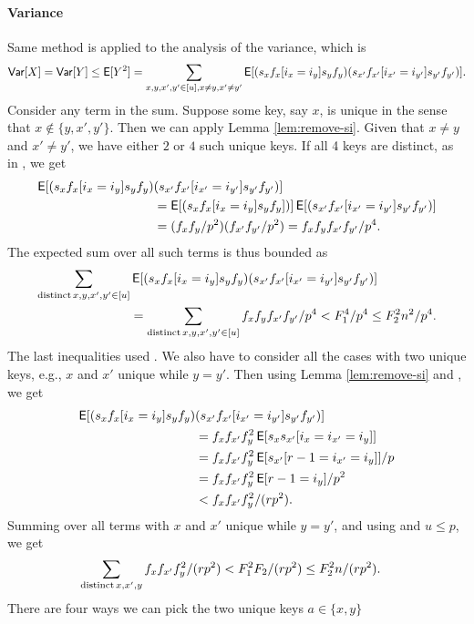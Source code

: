 \paragraph{Variance}
Same method is applied to the analysis of the variance, which is
\[{\sf Var}[X]={\sf Var}[Y]\leq \operatorname*{\sf{E}}[Y^2]=
\sum_{x,y,x',y'\in[u],x\neq y,x'\neq y'}\operatorname*{\sf{E}}[(s_x f_x[i_x=i_y]s_y f_y)
  (s_{x'}f_{x'}[i_{x'}=i_{y'}]s_{y'} f_{y'})].\] 
Consider any term in the
sum. Suppose some key, say $x$, is unique in the sense that
$x\not\in\{y,x',y'\}$. Then we can apply Lemma \ref{lem:remove-si}.
Given that $x\neq y$
and $x'\neq y'$, we have either $2$ or $4$ such unique keys. If all
4 keys are distinct, as in , we get
\begin{align*}
\operatorname*{\sf{E}}[(s_x f_x[i_x=i_y]s_y f_y)&
(s_{x'}f_{x'}[i_{x'}=i_{y'}]s_{y'} f_{y'})]\\
&=\operatorname*{\sf{E}}[(s_x f_x[i_x=i_y]s_y f_y])]\operatorname*{\sf{E}}[(s_{x'}f_{x'}[i_{x'}=i_{y'}]s_{y'} f_{y'})]\\
&=(f_x f_y/p^2)(f_{x'} f_{y'}/p^2)=f_x f_yf_{x'} f_{y'}/p^4.
\end{align*}
The expected sum over all such terms is thus bounded
as 
\begin{align}
\sum_{{\rm distinct}\, x,y,x',y'\in[u]}&
\operatorname*{\sf{E}}[(s_x f_x[i_x=i_y]s_y f_y)
(s_{x'}f_{x'}[i_{x'}=i_{y'}]s_{y'} f_{y'})]\nonumber\\
&=\sum_{{\rm distinct}\,x,y,x',y'\in[u]}
f_xf_yf_{x'}f_{y'}/p^4<F_1^4/p^4\leq F_2^2 n^2/p^4.\label{eq:distinct}
\end{align}
The last inequalities 
used . We also have to consider all the cases with two unique keys, e.g., $x$ 
and $x'$ unique while $y=y'$. Then using Lemma \ref{lem:remove-si} and , we get
\begin{align*}
\operatorname*{\sf{E}}[(s_x f_x[i_x=i_y]s_y f_y)&(s_{x'}f_{x'}[i_{x'}=i_{y'}]s_{y'} f_{y'})]\\
&=f_xf_{x'}f_y^2\operatorname*{\sf{E}}[s_xs_{x'} [i_x=i_{x'}=i_y]]\\
&=f_xf_{x'}f_y^2\operatorname*{\sf{E}}[s_{x'} [r-1=i_{x'}=i_y]]/p\\
&=f_xf_{x'}f_y^2\operatorname*{\sf{E}}[r-1=i_y]/p^2\\
    &<f_xf_{x'}f_y^2/(rp^2).
\end{align*}    
Summing over all terms with $x$ and $x'$ unique while $y=y'$, and
using  and $u\leq p$, we get 
\begin{align*}
  \sum_{{\rm distinct}\,x,x',y} f_xf_{x'}f_y^2 /(rp^2)&<
    F_1^2F_2/(rp^2)\leq F_2^2 n/(rp^2).
\end{align*}
There are four ways we can pick the two unique keys $a\in \{x,y\}$
